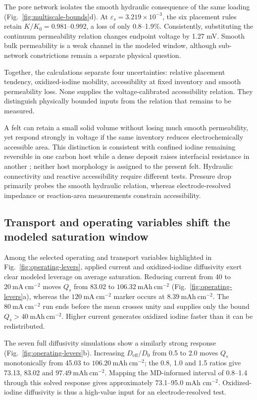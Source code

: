 \documentclass[11pt]{article}
\begin{document}
The pore network isolates the smooth hydraulic consequence of the same loading (Fig.~\ref{fig:multiscale-bounds}d). At $\varepsilon_s=3.219\times10^{-3}$, the six placement rules retain $K/K_0=0.981$--0.992, a loss of only 0.8--1.9\%. Consistently, substituting the continuum permeability relation changes endpoint voltage by 1.27 mV. Smooth bulk permeability is a weak channel in the modeled window, although sub-network constrictions remain a separate physical question.

Together, the calculations separate four uncertainties: relative placement tendency, oxidized-iodine mobility, accessibility at fixed inventory and smooth permeability loss. None supplies the voltage-calibrated accessibility relation. They distinguish physically bounded inputs from the relation that remains to be measured.

A felt can retain a small solid volume without losing much smooth permeability, yet respond strongly in voltage if the same inventory reduces electrochemically accessible area. This distinction is consistent with confined iodine remaining reversible in one carbon host while a dense deposit raises interfacial resistance in another \citep{SolidI2_NatCommun2020,Jang2021}; neither host morphology is assigned to the present felt. Hydraulic connectivity and reactive accessibility require different tests. Pressure drop primarily probes the smooth hydraulic relation, whereas electrode-resolved impedance or reaction-area measurements constrain accessibility.

\subsection{Transport and operating variables shift the modeled saturation window}


Among the selected operating and transport variables highlighted in Fig.~\ref{fig:operating-levers}, applied current and oxidized-iodine diffusivity exert clear modeled leverage on average saturation. Reducing current from 40 to $20~\mathrm{mA~cm^{-2}}$ moves $Q_s$ from 83.02 to $106.32~\mathrm{mAh~cm^{-2}}$ (Fig.~\ref{fig:operating-levers}a), whereas the $120~\mathrm{mA~cm^{-2}}$ marker occurs at $8.39~\mathrm{mAh~cm^{-2}}$. The $80~\mathrm{mA~cm^{-2}}$ run ends before the mean crosses unity and supplies only the bound $Q_s>40~\mathrm{mAh~cm^{-2}}$. Higher current generates oxidized iodine faster than it can be redistributed.

The seven full diffusivity simulations show a similarly strong response (Fig.~\ref{fig:operating-levers}b). Increasing $D_{\mathrm{eff}}/D_0$ from 0.5 to 2.0 moves $Q_s$ monotonically from 45.03 to $106.20~\mathrm{mAh~cm^{-2}}$; the 0.8, 1.0 and 1.5 ratios give 73.13, 83.02 and $97.49~\mathrm{mAh~cm^{-2}}$. Mapping the MD-informed interval of 0.8--1.4 through this solved response gives approximately 73.1--95.0 mAh cm$^{-2}$. Oxidized-iodine diffusivity is thus a high-value input for an electrode-resolved test.
\end{document}
